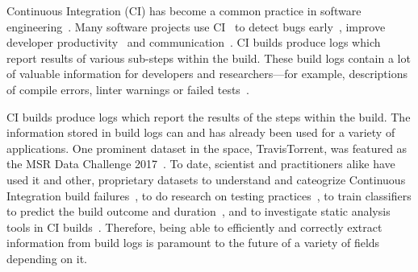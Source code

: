





Continuous Integration (CI) has become a common practice in software
engineering~\cite{hilton2016usage}.
Many software projects use
CI~\cite{hilton2016usage,staahl2014modeling,beller2017oops} to detect
bugs early~\cite{vasilescu2015quality,duvall2007continuous}, improve
developer productivity~\cite{miller2008hundred,hilton2016usage} and
communication~\cite{downs2012ambient}.
CI builds produce logs which
report results of various sub-steps within the build.
These build logs
contain a lot of valuable information for developers and researchers---for
example, descriptions of compile errors, linter warnings or failed
tests~\cite{beller2017oops,seo2014programmers,vassallo2017a-tale}.

CI builds produce logs which report the results of the steps within
the build.
The information stored in build logs can and has
already been used for a variety of applications.
One prominent dataset
in the space, TravisTorrent, was featured as the MSR Data Challenge
2017~\cite{msr17challenge}.
To date, scientist and practitioners alike
have used it and other, proprietary datasets to understand and
cateogrize Continuous Integration build
failures~\cite{islam2017insights}, to do research on testing
practices~\cite{orellana2017differences}, to train classifiers to
predict the build outcome and
duration~\cite{ni2017cost,bisong2017built,machalica2019predictive},
and to investigate static analysis tools in CI
builds~\cite{zampetti2017open}.
Therefore, being able to efficiently
and correctly extract information from build logs is paramount to the
future of a variety of fields depending on it.

